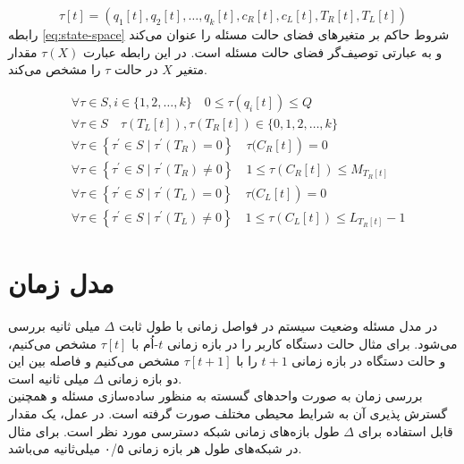 \begin{equation}
	\label{eg:state}
	\tau[t]=\left(q_{1}[t], q_{2}[t], \ldots, q_{k}[t], c_{R}[t], c_{L}[t], T_{R}[t], T_{L}[t]\right)
\end{equation}
رابطه \ref{eq:state-space} شروط حاکم بر متغیرهای فضای حالت مسئله را عنوان می‌کند و به عبارتی توصیف‌گر فضای حالت مسئله است. در این رابطه عبارت \(\tau(X)\) مقدار متغیر \(X\) در حالت \(\tau\) را مشخص می‌کند.

\begin{equation}
	\label{eq:state-space}
	\begin{aligned}
		&\forall \tau \in S, i \in \{1,2, \ldots, k\} \quad 0 \leqslant\tau\left(q_{i}[t]\right) \leqslant Q\\
		&\forall \tau \in S \quad  \tau\left(T_L[t]\right),  \tau\left(T_R[t]\right) \in \{0, 1,2, \ldots, k\}\\
		&\left.\forall \tau \in\left\{\tau^{\prime} \in S \mid \tau^{\prime}\left(T_{R}\right)=0\right\} \quad \tau(C_R[t]\right)=0\\
		&\forall \tau \in\left\{\tau^{\prime} \in S \mid \tau^{\prime}\left(T_{R}\right) \neq 0\right\} \quad 1 \leqslant \tau\left(C_{R}[t]\right) \leqslant M_{T_{R}[t]} \\
		&\left.\forall \tau \in\left\{\tau^{\prime} \in S \mid \tau^{\prime}\left(T_{L}\right)=0\right\} \quad \tau(C_L[t]\right)=0\\
		&\forall \tau \in\left\{\tau^{\prime} \in S \mid \tau^{\prime}\left(T_{L}\right) \neq 0\right\} \quad 1 \leqslant \tau\left(C_{L}[t]\right) \leqslant L_{T_{R}[t]} - 1
	\end{aligned}
\end{equation}

\newpage
\section{مدل زمان}
در مدل مسئله وضعیت سیستم در فواصل زمانی با طول ثابت \(\Delta\) میلی ثانیه بررسی می‌شود. برای مثال حالت دستگاه کاربر را در بازه زمانی \(t\)-اُم با \(\tau[t]\) مشخص می‌کنیم، و حالت دستگاه در بازه زمانی \(t + 1\) را با \(\tau[t + 1]\) مشخص می‌کنیم و فاصله بین این دو بازه زمانی \(\Delta\) میلی ثانیه است. \\

بررسی زمان به صورت واحدهای گسسته به منظور ساده‌سازی مسئله و همچنین گسترش پذیری آن به شرایط محیطی مختلف صورت گرفته است. در عمل، یک مقدار قابل استفاده برای \(\Delta\) طول بازه‌های زمانی شبکه دسترسی مورد نظر است. برای مثال در شبکه‌های  طول هر بازه زمانی ۰/۵ میلی‌ثانیه می‌باشد. \cite{LTE}

